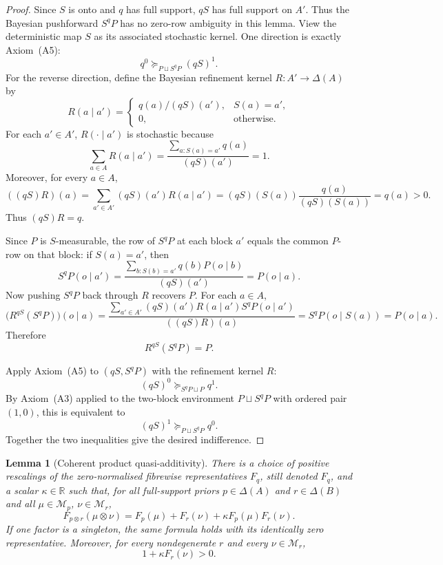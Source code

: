 \documentclass[11pt,a4paper]{article}
\newtheorem{lemma}[theorem]{Lemma}
\theoremstyle{definition}
\newcommand{\R}{\mathbb R}
\newcommand{\1}{\mathbf 1}
\begin{document}
\begin{proof}
Since $S$ is onto and $q$ has full support, $qS$ has full support on $A'$.  Thus the Bayesian pushforward $S^qP$ has no
zero-row ambiguity in this lemma.  View the deterministic map $S$ as its associated stochastic kernel.
One direction is exactly Axiom~\textup{(A5)}:
\[
q^0\succeq_{P\sqcup S^qP}(qS)^1.
\]
For the reverse direction, define the Bayesian refinement kernel $R:A'\to\Delta(A)$ by
\[
R(a\mid a')=
\begin{cases}
q(a)/(qS)(a'),&S(a)=a',\\
0,&\text{otherwise}.
\end{cases}
\]
For each $a'\in A'$, $R(\cdot\mid a')$ is stochastic because
\[
\sum_{a\in A}R(a\mid a')
=
\frac{\sum_{a:S(a)=a'}q(a)}{(qS)(a')}
=1.
\]
Moreover, for every $a\in A$,
\[
((qS)R)(a)
=
\sum_{a'\in A'}(qS)(a')R(a\mid a')
=
(qS)(S(a))\frac{q(a)}{(qS)(S(a))}
=q(a)>0.
\]
Thus $(qS)R=q$.

Since $P$ is $S$-measurable, the row of $S^qP$ at each block $a'$ equals the common $P$-row on that block: if $S(a)=a'$,
then
\[
S^qP(o\mid a')
=
\frac{\sum_{b:S(b)=a'}q(b)P(o\mid b)}{(qS)(a')}
=
P(o\mid a).
\]
Now pushing $S^qP$ back through $R$ recovers $P$.  For each $a\in A$,
\[
\bigl(R^{qS}(S^qP)\bigr)(o\mid a)
=
\frac{\sum_{a'\in A'}(qS)(a')R(a\mid a')S^qP(o\mid a')}{((qS)R)(a)}
=
S^qP(o\mid S(a))
=
P(o\mid a).
\]
Therefore
\[
R^{qS}(S^qP)=P.
\]

Apply Axiom~\textup{(A5)} to $(qS,S^qP)$ with the refinement kernel $R$:
\[
(qS)^0\succeq_{S^qP\sqcup P}q^1.
\]
By Axiom~\textup{(A3)} applied to the two-block environment $P\sqcup S^qP$ with ordered pair $(1,0)$, this is equivalent
to
\[
(qS)^1\succeq_{P\sqcup S^qP}q^0.
\]
Together the two inequalities give the desired indifference.
\end{proof}

\begin{lemma}[Coherent product quasi-additivity]\label{lem:coherentnorm}
There is a choice of positive rescalings of the zero-normalised fibrewise representatives $F_q$, still denoted $F_q$,
and a scalar $\kappa\in\R$ such that, for all full-support priors $p\in\Delta(A)$ and $r\in\Delta(B)$ and all
$\mu\in\mathcal M_p$, $\nu\in\mathcal M_r$,
\begin{equation}
F_{p\otimes r}(\mu\otimes\nu)
=F_p(\mu)+F_r(\nu)+\kappa F_p(\mu)F_r(\nu).
\tag{QA}\label{eq:QA}
\end{equation}
If one factor is a singleton, the same formula holds with its identically zero representative.  Moreover, for every
nondegenerate $r$ and every $\nu\in\mathcal M_r$,
\begin{equation}
1+\kappa F_r(\nu)>0.
\tag{POS}\label{eq:QAslope}
\end{equation}
\end{lemma}
\end{document}
